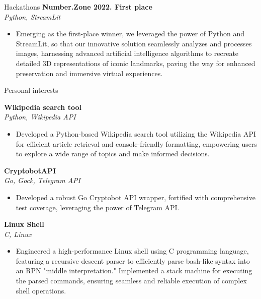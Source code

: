 \documentclass{resume} %
\begin{document}
\begin{rSection}{Hackathons}
{\bf Number.Zone 2022. First place}   \hfill {}
\\{\textit{Python, StreamLit}}
\begin{itemize}
    \item Emerging as the first-place winner, we leveraged the power of Python and StreamLit, so that our innovative solution seamlessly analyzes and processes images, harnessing advanced artificial intelligence algorithms to recreate detailed 3D representations of iconic landmarks, paving the way for enhanced preservation and immersive virtual experiences.
\end{itemize}

\end{rSection}

\begin{rSection}{Personal interests}

{\bf Wikipedia search tool} 
\\{\textit{Python, Wikipedia API}}
\begin{itemize}
    \item Developed a Python-based Wikipedia search tool utilizing the Wikipedia API for efficient article retrieval and console-friendly formatting, empowering users to explore a wide range of topics and make informed decisions.
\end{itemize}

{\bf CryptobotAPI} 
\\{\textit{Go, Gock, Telegram API}}
\begin{itemize}
    \item Developed a robust Go Cryptobot API wrapper, fortified with comprehensive test coverage, leveraging the power of Telegram API.
\end{itemize}

{\bf Linux Shell} 
\\{\textit{C, Linux}}
\begin{itemize}
    \item Engineered a high-performance Linux shell using C programming language, featuring a recursive descent parser to efficiently parse bash-like syntax into an RPN "middle interpretation." Implemented a stack machine for executing the parsed commands, ensuring seamless and reliable execution of complex shell operations.
\end{itemize}

\end{rSection}
\end{document}
